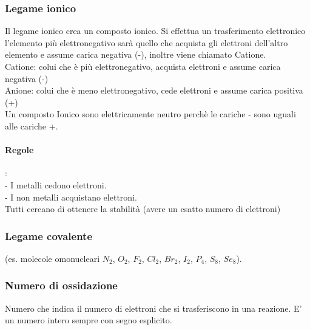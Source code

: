 \subsubsection{Legame ionico}
Il legame ionico crea un composto ionico. Si effettua un trasferimento elettronico l'elemento più elettronegativo sarà quello che acquista gli elettroni dell'altro elemento e assume carica negativa (-), inoltre viene chiamato Catione.\\
Catione: colui che è più elettronegativo, acquista elettroni e assume carica negativa (-)\\
Anione: colui che è meno elettronegativo, cede elettroni e assume carica positiva (+)\\
Un composto Ionico sono elettricamente neutro perchè le cariche - sono uguali alle cariche +.\\
\paragraph{Regole}:\\
- I metalli cedono elettroni.\\
- I non metalli acquistano elettroni.\\
Tutti cercano di ottenere la stabilità (avere un esatto numero di elettroni)\\
\subsubsection{Legame covalente}
(es. molecole omonucleari $N_2$, $O_2$, $F_2$, $Cl_2$, $Br_2$, $I_2$, $P_4$, $S_8$, $Se_8$).\\
\subsubsection{Numero di ossidazione}
Numero che indica il numero di elettroni che si trasferiscono in una reazione. E' un numero intero sempre con segno esplicito.\\
